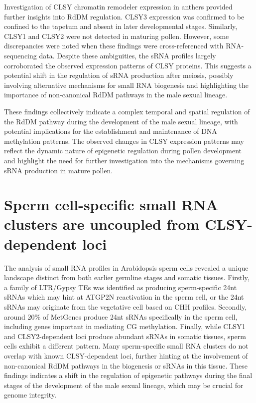 Investigation of CLSY chromatin remodeler expression in anthers provided further insights into RdDM regulation. CLSY3 expression was confirmed to be confined to the tapetum and absent in later developmental stages. Similarly, CLSY1 and CLSY2 were not detected in maturing pollen. However, some discrepancies were noted when these findings were cross-referenced with RNA-sequencing data. Despite these ambiguities, the sRNA profiles largely corroborated the observed expression patterns of CLSY proteins. This suggests a potential shift in the regulation of sRNA production after meiosis, possibly involving alternative mechanisms for small RNA biogenesis and highlighting the importance of non-canonical RdDM pathways in the male sexual lineage.

These findings collectively indicate a complex temporal and spatial regulation of the RdDM pathway during the development of the male sexual lineage, with potential implications for the establishment and maintenance of DNA methylation patterns. The observed changes in CLSY expression patterns may reflect the dynamic nature of epigenetic regulation during pollen development and highlight the need for further investigation into the mechanisms governing sRNA production in mature pollen.

\section{Sperm cell-specific small RNA clusters are uncoupled from CLSY-dependent loci}

The analysis of small RNA profiles in Arabidopsis sperm cells revealed a unique landscape distinct from both earlier germline stages and somatic tissues. Firstly, a family of LTR/Gypsy TEs was identified as producing sperm-specific 24nt sRNAs which may hint at ATGP2N reactivation in the sperm cell, or the 24nt sRNAs may originate from the vegetative cell based on CHH profiles. Secondly, around 20\% of MetGenes produce 24nt sRNAs specifically in the sperm cell, including genes important in mediating CG methylation. Finally, while CLSY1 and CLSY2-dependent loci produce abundant sRNAs in somatic tissues, sperm cells exhibit a different pattern. Many sperm-specific small RNA clusters do not overlap with known CLSY-dependent loci, further hinting at the involvement of non-canonical RdDM pathways in the biogenesis or sRNAs in this tissue. These findings indicates a shift in the regulation of epigenetic pathways during the final stages of the development of the male sexual lineage, which may be crucial for genome integrity. 


